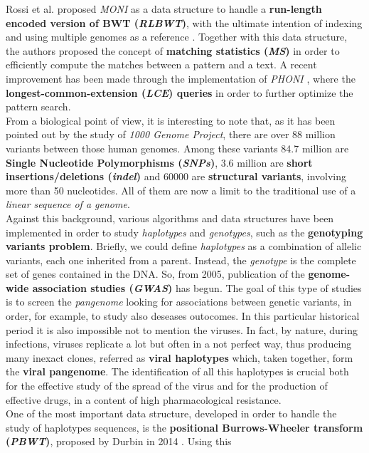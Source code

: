 \documentclass[a4paper,11pt, oneside]{article}
\begin{document}
Rossi et al. proposed \textit{MONI} as a data structure to handle a 
\textbf{run-length encoded version of BWT (\textit{RLBWT})}, with the ultimate
intention of indexing and using multiple genomes as a reference
\cite{moni}. Together with this data structure, the authors proposed the concept
of \textbf{matching statistics (\textit{MS})} in order to efficiently compute
the matches between a pattern and a text. A recent improvement has been made
through the implementation of \textit{PHONI} \cite{phoni}, where the
\textbf{longest-common-extension (\textit{LCE}) queries} in order to further
optimize the pattern search.\\ 
From a biological point of view, it is interesting to note that, as it has been
pointed out by the study of \textit{1000 Genome Project}, there are over 88
million variants between those human genomes. Among these variants 84.7 million
are \textbf{Single 
  Nucleotide Polymorphisms (\textit{SNPs})}, 3.6 million are \textbf{short
  insertions/deletions (\textit{indel})} and 60000 are \textbf{structural
  variants}, 
involving more than 
50 nucleotides. All of them are now a limit to the traditional use of a
\textit{linear sequence of a genome}.\\
Against this background, various algorithms and data structures have
been implemented in order to study \textit{haplotypes} and
\textit{genotypes}, such as the \textbf{genotyping variants
  problem}. Briefly, we could define \textit{haplotypes} as a combination 
of allelic variants, each one inherited from a parent. Instead, the
\textit{genotype} is the complete set of genes contained in the DNA. So, from
2005, publication of the \textbf{genome-wide association studies
  (\textit{GWAS})} has begun. The goal of this type of studies is to screen the 
\textit{pangenome} looking for associations between genetic variants, in order,
for example, to study also deseases outocomes.
In this particular historical period it is also impossible not to mention the
viruses. In fact, by nature, during infections, viruses replicate a lot but
often in a not perfect way, thus producing many inexact clones, referred as
\textbf{viral haplotypes} which, taken together, form the \textbf{viral
  pangenome}. The identification of all this haplotypes is crucial both for the
effective study of the spread of the virus and for the production of effective
drugs, in a content of high pharmacological resistance. \\
One of the most important data structure, developed in order to handle the study
of haplotypes sequences, is the \textbf{positional Burrows-Wheeler transform
  (\textit{PBWT})}, proposed by Durbin in 2014 \cite{pbwt_durbin}. Using this
\end{document}
